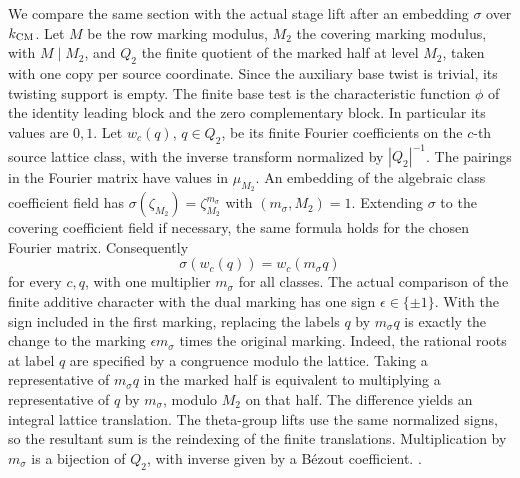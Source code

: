 We compare the same section with the actual stage lift
after an embedding \(\sigma\) over \(k_{\rm CM}\).
Let \(M\) be the row marking modulus, \(M_2\) the covering
marking modulus, with \(M\mid M_2\), and \(Q_2\) the finite
quotient of the marked half at level \(M_2\), taken with
one copy per source coordinate. Since the auxiliary base
twist is trivial, its twisting support is empty. The
finite base test is the characteristic function \(\phi\)
of the identity leading block and the zero complementary
block. In particular its values are \(0,1\). Let
\(w_c(q)\), \(q\in Q_2\), be its finite Fourier
coefficients on the \(c\)-th source lattice class, with
the inverse transform normalized by \(|Q_2|^{-1}\).
The pairings in the Fourier matrix have values in
\(\mu_{M_2}\). An embedding of the algebraic class
coefficient field has
\(\sigma(\zeta_{M_2})=\zeta_{M_2}^{m_\sigma}\) with
\((m_\sigma,M_2)=1\). Extending \(\sigma\) to the covering
coefficient field if necessary, the same formula holds
for the chosen Fourier matrix. Consequently
\[
 \sigma(w_c(q))=w_c(m_\sigma q)
\]
for every \(c,q\), with one multiplier \(m_\sigma\) for
all classes. The actual comparison of the finite
additive character with the dual marking has one sign
\(\epsilon\in\{\pm1\}\). With the sign included in the
first marking, replacing the labels \(q\) by \(m_\sigma q\)
is exactly the change to the marking \(\epsilon m_\sigma\)
times the original marking. Indeed, the rational roots
at label \(q\) are specified by a congruence modulo the
lattice. Taking a representative of \(m_\sigma q\) in
the marked half is equivalent to multiplying a
representative of \(q\) by \(m_\sigma\), modulo \(M_2\)
on that half. The difference yields an integral
lattice translation. The theta-group lifts use the
same normalized signs, so the resultant sum is the
reindexing of the finite translations. Multiplication
by \(m_\sigma\) is a bijection of \(Q_2\), with inverse
given by a B\'ezout coefficient.
.

